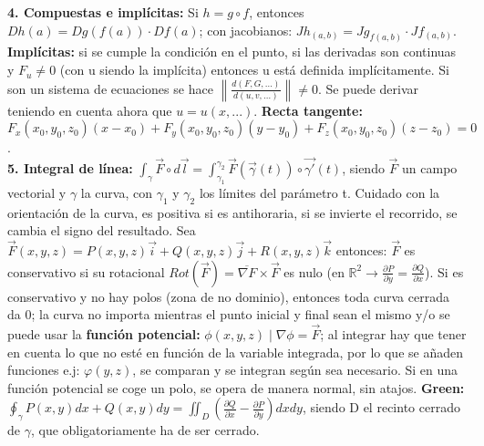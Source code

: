 \documentclass[a4paper, landscape, 11pt]{article}
\begin{document}
\textbf{4. Compuestas e implícitas:} Si $h = g \circ f$, entonces $Dh(a) = Dg(f(a)) \cdot Df(a)$; con jacobianos: $Jh_{(a,b)} = Jg_{f(a,b)} \cdot Jf_{(a,b)}$. \textbf{Implícitas:} si se cumple la condición en el punto, si las derivadas son continuas y $F_{u} \neq 0$ (con u siendo la implícita) entonces u está definida implícitamente. Si son un sistema de ecuaciones se hace $\left\| \frac{d(F, G, \ldots)}{d(u,v, \ldots)} \right\| \neq 0$. Se puede derivar teniendo en cuenta ahora que $u = u(x,...)$. \textbf{Recta tangente:} $F_{x}(x_{0}, y_{0}, z_{0})(x - x_{0}) + F_{y}(x_{0}, y_{0}, z_{0})(y - y_{0}) + F_{z}(x_{0}, y_{0}, z_{0})(z - z_{0}) = 0$.
\\

\textbf{5. Integral de línea:} $\int_{\gamma} \vec{F} \circ d\vec{l} = \int_{\gamma_{1}}^{\gamma_{2}}\vec{F}(\vec{\gamma}(t)) \circ \vec{\gamma '}(t)$, siendo $\vec{F}$ un campo vectorial y $\gamma$ la curva, con $\gamma_{1}$ y $\gamma_{2}$ los límites del parámetro t. Cuidado con la orientación de la curva, es positiva si es antihoraria, si se invierte el recorrido, se cambia el signo del resultado. Sea $\vec{F}(x,y,z) = P(x,y,z)\vec{i} + Q(x,y,z)\vec{j} + R(x,y,z)\vec{k}$ entonces: $\vec{F}$ es conservativo si su rotacional $Rot(\vec{F}) = \overline{\nabla F} \times \vec{F}$  es nulo (en $\mathbb{R}^{2} \to \frac{\partial P}{\partial y} = \frac{\partial Q}{\partial x}$). Si es conservativo y no hay polos (zona de no dominio), entonces toda curva cerrada da 0; la curva no importa mientras el punto inicial y final sean el mismo y/o se puede usar la \textbf{función potencial:} $\phi(x,y,z) \mid \nabla \phi = \vec{F}$; al integrar hay que tener en cuenta lo que no esté en función de la variable integrada, por lo que se añaden funciones e.j: $\varphi(y,z)$, se comparan y se integran según sea necesario. Si en una función potencial se coge un polo, se opera de manera normal, sin atajos. \textbf{Green:} $\oint_{\gamma} P(x,y)dx + Q(x,y)dy = \iint_{D} (\frac{\partial Q}{\partial x} - \frac{\partial P}{\partial y}) dxdy$, siendo D el recinto cerrado de $\gamma$, que obligatoriamente ha de ser cerrado. 
\\
\end{document}
